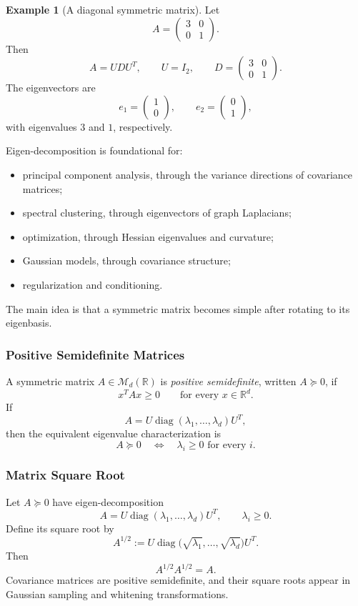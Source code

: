 \documentclass[12pt,oneside]{book}
\numberwithin{equation}{section}
\theoremstyle{definition}
\newtheorem{example}{Example}[section]
\theoremstyle{plain}
\theoremstyle{remark}
\newcommand{\R}{\mathbb{R}}
\newcommand{\diag}{\operatorname{diag}}
\begin{document}
\begin{example}[A diagonal symmetric matrix]
Let
\[
A=
\begin{pmatrix}
3&0\\
0&1
\end{pmatrix}.
\]
Then
\[
A=UDU^T,
\qquad
U=I_2,
\qquad
D=
\begin{pmatrix}
3&0\\
0&1
\end{pmatrix}.
\]
The eigenvectors are
\[
e_1=\begin{pmatrix}1\\0\end{pmatrix},
\qquad
e_2=\begin{pmatrix}0\\1\end{pmatrix},
\]
with eigenvalues $3$ and $1$, respectively.
\end{example}

Eigen-decomposition is foundational for:
\begin{itemize}
    \item principal component analysis, through the variance directions of covariance matrices;
    \item spectral clustering, through eigenvectors of graph Laplacians;
    \item optimization, through Hessian eigenvalues and curvature;
    \item Gaussian models, through covariance structure;
    \item regularization and conditioning.
\end{itemize}
The main idea is that a symmetric matrix becomes simple after rotating to its eigenbasis.

\subsubsection{Positive Semidefinite Matrices}
A symmetric matrix $A\in\mathcal{M}_d(\R)$ is \emph{positive semidefinite}, written $A\succeq0$, if
\[
x^TAx\geq0
\qquad\text{for every }x\in\R^d.
\]
If
\[
A=U\diag(\lambda_1,\ldots,\lambda_d)U^T,
\]
then the equivalent eigenvalue characterization is
\[
A\succeq0
\quad\Longleftrightarrow\quad
\lambda_i\geq0\text{ for every }i.
\]

\subsubsection{Matrix Square Root}
Let $A\succeq0$ have eigen-decomposition
\[
A=U\diag(\lambda_1,\ldots,\lambda_d)U^T,
\qquad \lambda_i\geq0.
\]
Define its square root by
\[
A^{1/2}:=
U\diag\bigl(\sqrt{\lambda_1},\ldots,\sqrt{\lambda_d}\bigr)U^T.
\]
Then
\[
A^{1/2}A^{1/2}=A.
\]
Covariance matrices are positive semidefinite, and their square roots appear in Gaussian sampling and whitening transformations.
\end{document}

